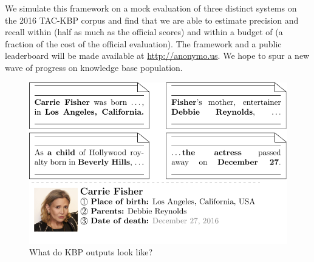 
We simulate this framework on a mock evaluation of three distinct systems on the 2016 TAC-KBP corpus and find that we are able to estimate precision and recall within  \fone{} (half as much as the official scores) and within a budget of  (a fraction of the cost of the official evaluation).
The framework and a public leaderboard will be made available at \url{http://anonymo.us}.
We hope to spur a new wave of progress on knowledge base population. 

\begin{figure}[t]
  \includegraphics[width=\columnwidth]{figures/task}
  \caption{\label{fig:task}
  What do KBP outputs look like?
  }
\end{figure}




